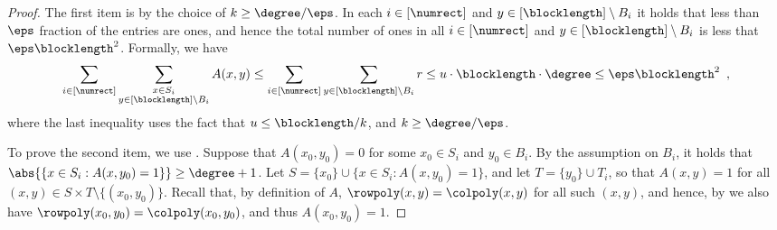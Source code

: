 \documentclass{toc}
\theoremstyle{plain}
\begin{document}
    \begin{proof}
        The first item is by the choice of $k \geq \degree/\eps$.
        In each $i \in [\numrect]$ and $y \in [\blocklength] \setminus B_i$ it holds that
        less than $\eps$ fraction of the entries are ones,
        and hence the total number of ones in all $i \in [\numrect]$ and $y \in [\blocklength] \setminus B_i$
        is less that $\eps \blocklength^2$.
        Formally, we have
        \begin{equation*}
        \sum_{i \in [\numrect]} \sum_{\substack{x \in S_i \\ y \in [\blocklength] \setminus B_i}} A(x,y) \leq \sum_{i \in [\numrect]} \sum_{y \in [\blocklength] \setminus B_i} r  \leq u \cdot \blocklength \cdot \degree \leq \eps \blocklength^2 \enspace,
        \end{equation*}
        where the last inequality uses the fact that $u \leq \blocklength/k$, and $k \geq \degree/\eps$.

        To prove the second item, we use .
        Suppose that $A(x_0,y_0)=0$ for some $x_0 \in S_i$ and $y_0 \in B_i$.
        By the assumption on $B_i$, it holds that $\abs{\{x \in S_i : A(x,y_0) = 1\}} \geq \degree+1$.
        Let $S = \{x_0\} \cup \{x \in S_i : A(x,y_0) = 1\}$,
        and let $T = \{y_0\} \cup T_i$, so that $A(x,y) = 1$ for all
        $(x,y) \in S \times T \setminus \{(x_0,y_0)\}$.
        Recall that, by definition of $A$,
        $\rowpoly(x,y) = \colpoly(x,y)$ for all such $(x,y)$,
        and hence, by 
        we also have $\rowpoly(x_0,y_0) = \colpoly(x_0,y_0)$, and thus $A(x_0,y_0) = 1$.
    \end{proof}
\end{document}
